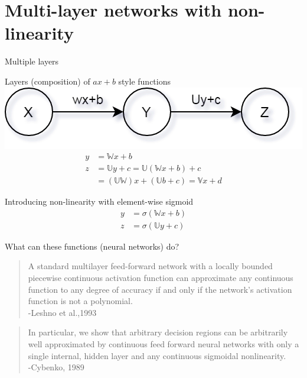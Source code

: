 \section{Multi-layer networks with non-linearity}
\begin{frame}{Multiple layers}
	\begin{block}{Layers (composition) of $ax+b$ style functions}
		\includegraphics[width=.5\textwidth, center]{figuras/two_layer_simple.png}
		\begin{align*}
		y &= \mathbb{W} x + b  \\
		z &= \mathbb{U} y + c =\mathbb{U}(\mathbb{W}x+b)+c \\
		  &= (\mathbb{U}\mathbb{W})x + (\mathbb{U}b+c) = \mathbb{V}x+d 
		\end{align*}
	\end{block}
	\begin{block}{Introducing non-linearity with element-wise sigmoid}
		\begin{align*}
		y &= \sigma(\mathbb{W} x + b) \\ 
		z &= \sigma(\mathbb{U} y + c) 
		\end{align*}
	\end{block}
\end{frame}

\begin{frame}{What can these functions (neural networks) do?}
\begin{quote}
	{\small
		A standard multilayer feed-forward network with a locally bounded 
		piecewise continuous activation function can approximate any continuous 
		function to any degree of accuracy if and only if the network's activation 
		function is not a polynomial.\\
		-Leshno et al.,1993
	}
\end{quote}
\begin{quote}
	{\small 
		In particular, we show that arbitrary decision regions can
		be arbitrarily well approximated by continuous feed forward neural networks with
		only a single internal, hidden layer and any continuous sigmoidal nonlinearity.\\
		-Cybenko, 1989 
	}
\end{quote}
\end{frame}

